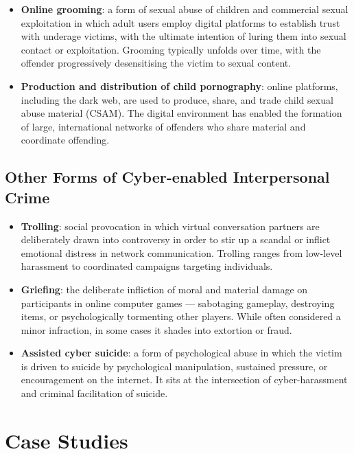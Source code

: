 \documentclass[11pt,a4paper,openany]{report}
\theoremstyle{definition}
\theoremstyle{plain}
\theoremstyle{remark}
\begin{document}
\begin{itemize}
    \item \textbf{Online grooming}: a form of sexual abuse of children and commercial sexual exploitation in which adult users employ digital platforms to establish trust with underage victims, with the ultimate intention of luring them into sexual contact or exploitation. Grooming typically unfolds over time, with the offender progressively desensitising the victim to sexual content.

    \item \textbf{Production and distribution of child pornography}: online platforms, including the dark web, are used to produce, share, and trade child sexual abuse material (CSAM). The digital environment has enabled the formation of large, international networks of offenders who share material and coordinate offending.
\end{itemize}

\subsection{Other Forms of Cyber-enabled Interpersonal Crime}

\begin{itemize}
    \item \textbf{Trolling}: social provocation in which virtual conversation partners are deliberately drawn into controversy in order to stir up a scandal or inflict emotional distress in network communication. Trolling ranges from low-level harassment to coordinated campaigns targeting individuals.

    \item \textbf{Griefing}: the deliberate infliction of moral and material damage on participants in online computer games --- sabotaging gameplay, destroying items, or psychologically tormenting other players. While often considered a minor infraction, in some cases it shades into extortion or fraud.

    \item \textbf{Assisted cyber suicide}: a form of psychological abuse in which the victim is driven to suicide by psychological manipulation, sustained pressure, or encouragement on the internet. It sits at the intersection of cyber-harassment and criminal facilitation of suicide.
\end{itemize}


\section{Case Studies}
\end{document}
